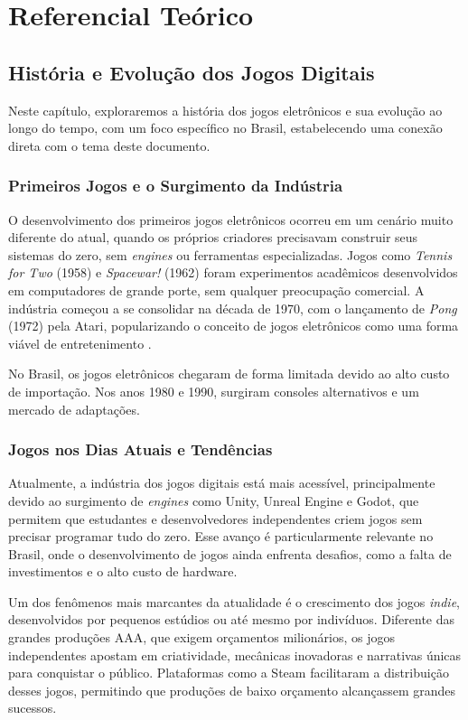 \chapter{Referencial Teórico}


\section{História e Evolução dos Jogos Digitais}

Neste capítulo, exploraremos a história dos jogos eletrônicos e sua evolução ao longo do tempo, com um foco específico no Brasil, estabelecendo uma conexão direta com o tema deste documento.

\subsection{Primeiros Jogos e o Surgimento da Indústria}

O desenvolvimento dos primeiros jogos eletrônicos ocorreu em um cenário muito diferente do atual, quando os próprios criadores precisavam construir seus sistemas do zero, sem \textit{engines} ou ferramentas especializadas. Jogos como \textit{Tennis for Two} (1958) e \textit{Spacewar!} (1962) foram experimentos acadêmicos desenvolvidos em computadores de grande porte, sem qualquer preocupação comercial. A indústria começou a se consolidar na década de 1970, com o lançamento de \textit{Pong} (1972) pela Atari, popularizando o conceito de jogos eletrônicos como uma forma viável de entretenimento \cite{kent2001}.

No Brasil, os jogos eletrônicos chegaram de forma limitada devido ao alto custo de importação. Nos anos 1980 e 1990, surgiram consoles alternativos e um mercado de adaptações.

\subsection{Jogos nos Dias Atuais e Tendências}

Atualmente, a indústria dos jogos digitais está mais acessível, principalmente devido ao surgimento de \textit{engines} como Unity, Unreal Engine e Godot, que permitem que estudantes e desenvolvedores independentes criem jogos sem precisar programar tudo do zero. Esse avanço é particularmente relevante no Brasil, onde o desenvolvimento de jogos ainda enfrenta desafios, como a falta de investimentos e o alto custo de hardware.

Um dos fenômenos mais marcantes da atualidade é o crescimento dos jogos \textit{indie}, desenvolvidos por pequenos estúdios ou até mesmo por indivíduos. Diferente das grandes produções AAA, que exigem orçamentos milionários, os jogos independentes apostam em criatividade, mecânicas inovadoras e narrativas únicas para conquistar o público. Plataformas como a Steam facilitaram a distribuição desses jogos, permitindo que produções de baixo orçamento alcançassem grandes sucessos.

